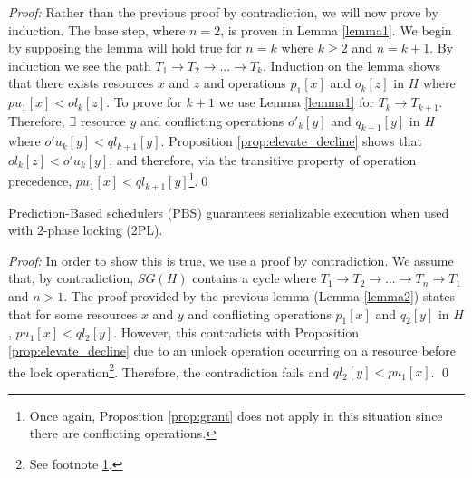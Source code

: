 \textit{Proof:} Rather than the previous proof by contradiction, we will now prove by induction. The base step, where $n = 2$, is proven in Lemma \ref{lemma1}. We begin by supposing the lemma will hold true for $n = k$ where $k \geq 2$ and $n = k + 1$. By induction we see the path $T_{1} \rightarrow T_{2} \rightarrow ... \rightarrow T_{k}$. Induction on the lemma shows that there exists resources $x$ and $z$ and operations $p_{1}[x]$ and $o_{k}[z]$ in $H$ where $pu_{1}[x] < ol_{k}[z]$. To prove for $k + 1$ we use Lemma \ref{lemma1} for $T_{k} \rightarrow T_{k+1}$. Therefore, $\exists$ resource $y$ and conflicting operations $o'_{k}[y]$ and $q_{k+1}[y]$ in $H$ where $o'u_{k}[y] < ql_{k+1}[y]$. Proposition \ref{prop:elevate_decline} shows that $ol_{k}[z] < o'u_{k}[y]$, and therefore, via the transitive property of operation precedence, $pu_{1}[x] < ql_{k+1}[y]$\footnote{\label{note1}Once again, Proposition \ref{prop:grant} does not apply in this situation since there are conflicting operations.}.\qed

\begin{theorem}
\label{theorem1}
Prediction-Based schedulers (\ac{PBS}) guarantees serializable execution when used with 2-phase locking (\ac{2PL}).
\end{theorem}


\textit{Proof:} In order to show this is true, we use a proof by contradiction. We assume that, by contradiction, $SG(H)$ contains a cycle where $T_{1} \rightarrow T_{2} \rightarrow ... \rightarrow T_{n} \rightarrow T_{1}$ and $n > 1$. The proof provided by the previous lemma (Lemma \ref{lemma2}) states that for some resources $x$ and $y$ and conflicting operations $p_{1} [x]$ and $q_{2}[y]$ in $H$, $pu_{1}[x] < ql_{2}[y]$. However, this contradicts with Proposition \ref{prop:elevate_decline} due to an unlock operation occurring on a resource before the lock operation\footnote{See footnote \ref{note1}.}. Therefore, the contradiction fails and $ql_{2}[y] < pu_{1}[x]$. \qed